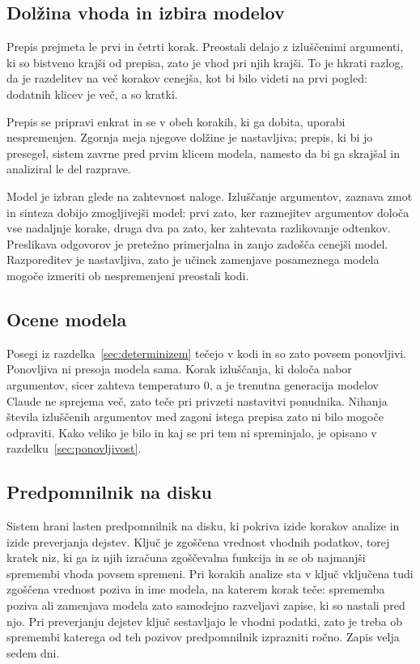 \documentclass[a4paper, 12pt]{book}
\begin{document}
\subsection{Dolžina vhoda in izbira modelov}
\label{ssec:vhod-modeli}

Prepis prejmeta le prvi in četrti korak. Preostali delajo z izluščenimi
argumenti, ki so bistveno krajši od prepisa, zato je vhod pri njih krajši. To
je hkrati razlog, da je razdelitev na več korakov cenejša, kot bi bilo videti na
prvi pogled: dodatnih klicev je več, a so kratki.

Prepis se pripravi enkrat in se v obeh korakih, ki ga dobita, uporabi
nespremenjen. Zgornja meja njegove dolžine je nastavljiva; prepis, ki bi jo
presegel, sistem zavrne pred prvim klicem modela, namesto da bi ga skrajšal in
analiziral le del razprave.

Model je izbran glede na zahtevnost naloge. Izluščanje argumentov, zaznava zmot
in sinteza dobijo zmogljivejši model: prvi zato, ker razmejitev argumentov
določa vse nadaljnje korake, druga dva pa zato, ker zahtevata razlikovanje
odtenkov. Preslikava odgovorov je pretežno primerjalna in zanjo zadošča cenejši
model. Razporeditev je nastavljiva, zato je učinek zamenjave posameznega modela
mogoče izmeriti ob nespremenjeni preostali kodi.

\subsection{Ocene modela}
\label{ssec:ocene-modela}

Posegi iz razdelka~\ref{sec:determinizem} tečejo v kodi in so zato povsem
ponovljivi. Ponovljiva ni presoja modela sama. Korak izluščanja, ki določa
nabor argumentov, sicer zahteva temperaturo 0, a je trenutna generacija modelov
Claude ne sprejema več, zato teče pri privzeti nastavitvi ponudnika. Nihanja
števila izluščenih argumentov med zagoni istega prepisa zato ni bilo mogoče
odpraviti. Kako veliko je bilo in kaj se pri tem ni spreminjalo, je opisano v
razdelku~\ref{sec:ponovljivost}.

\subsection{Predpomnilnik na disku}
\label{ssec:disk-cache}

Sistem hrani lasten predpomnilnik na disku, ki pokriva izide korakov analize in
izide preverjanja dejstev. Ključ je zgoščena vrednost vhodnih podatkov, torej
kratek niz, ki ga iz njih izračuna zgoščevalna funkcija in se ob najmanjši
spremembi vhoda povsem spremeni. Pri korakih analize sta v ključ vključena tudi
zgoščena vrednost poziva in ime modela, na katerem korak teče: sprememba poziva
ali zamenjava modela zato samodejno razveljavi zapise, ki so nastali pred njo.
Pri preverjanju dejstev ključ sestavljajo le vhodni podatki, zato je treba ob
spremembi katerega od teh pozivov predpomnilnik izprazniti ročno. Zapis velja
sedem dni.
\end{document}
